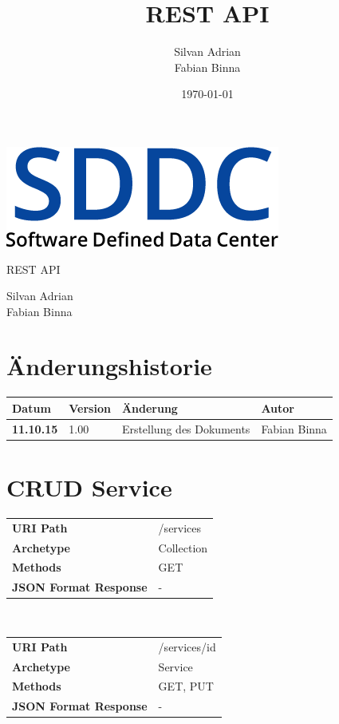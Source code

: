 \documentclass[11pt]{scrartcl}
\title{REST API}
\author{Silvan Adrian \\ Fabian Binna}
\date{\today{}}
\begin{document}
\def\arraystretch{1.5}
\begin{titlepage}
\begin{center}
\vspace{10em}
\includegraphics[scale=2]{SDDC}
\vspace{10em}
\end{center}
\begin{center}
\huge {REST API}
\end{center}
\begin{center}
\vspace{10em}
\LARGE {Silvan Adrian} \\
\LARGE {Fabian Binna}
\end{center}

\end{titlepage}

\newpage
\section{Änderungshistorie}
\begin{tabularx}{\linewidth}{l l X l}
\textbf{Datum} & \textbf{Version} & \textbf{Änderung}  & \textbf{Autor} \\
\hline
\textbf{11.10.15} & 1.00 & Erstellung des Dokuments & Fabian Binna \\

\end{tabularx}

\newpage
\tableofcontents
\newpage

\section{CRUD Service}

\begin{tabularx}{\linewidth}{l l}
\textbf{URI Path} & /services\\
\textbf{Archetype} & Collection\\
\textbf{Methods} & GET\\
\textbf{JSON Format Response} & -\\
\end{tabularx}
\\
\begin{tabularx}{\linewidth}{l l}
\textbf{URI Path} & /services/{id}\\
\textbf{Archetype} & Service\\
\textbf{Methods} & GET, PUT\\
\textbf{JSON Format Response} & -\\
\end{tabularx}
\end{document}
